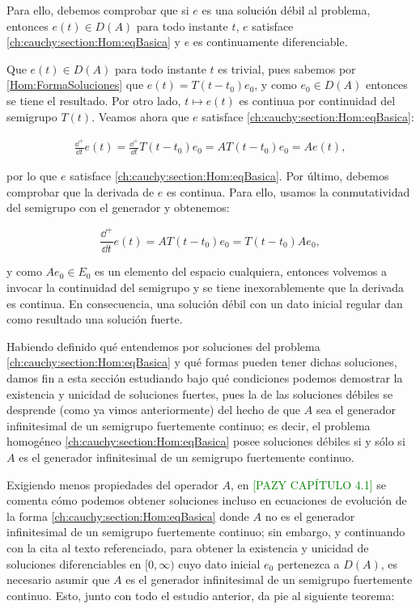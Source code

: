 Para ello, debemos comprobar que si $e$ es una solución débil al problema, entonces $e(t) \in D(A)$ para todo instante $t$, $e$ satisface \eqref{ch:cauchy:section:Hom:eqBasica} y $e$ es continuamente diferenciable.

Que $e(t) \in D(A)$ para todo instante $t$ es trivial, pues sabemos por \eqref{Hom:FormaSoluciones} que $e(t) = T(t-t_0)e_0$, y como $e_0 \in D(A)$ entonces se tiene el resultado. Por otro lado, $t \mapsto e(t)$ es continua por continuidad del semigrupo $T(t)$. Veamos ahora que $e$ satisface \eqref{ch:cauchy:section:Hom:eqBasica}:

\begin{align*}
    \frac{\dd^+}{\dd t}e(t) = \frac{\dd^+}{\dd t}T(t-t_0)e_0 = AT(t-t_0)e_0 = Ae(t),
\end{align*}

por lo que $e$ satisface \eqref{ch:cauchy:section:Hom:eqBasica}. Por último, debemos comprobar que la derivada de $e$ es continua. Para ello, usamos la conmutatividad del semigrupo con el generador y obtenemos:

\[\frac{\dd^+}{\dd t}e(t) = AT(t-t_0)e_0 = T(t-t_0)Ae_0,\]

y como $Ae_0 \in E_0$ es un elemento del espacio cualquiera, entonces volvemos a invocar la continuidad del semigrupo y se tiene inexorablemente que la derivada es continua. En consecuencia, una solución débil con un dato inicial regular dan como resultado una solución fuerte.

Habiendo definido qué entendemos por soluciones del problema \eqref{ch:cauchy:section:Hom:eqBasica} y qué formas pueden tener dichas soluciones, damos fin a esta sección estudiando bajo qué condiciones podemos demostrar la existencia y unicidad de soluciones fuertes, pues la de las soluciones débiles se desprende (como ya vimos anteriormente) del hecho de que $A$ sea el generador infinitesimal de un semigrupo fuertemente continuo; es decir, el problema homogéneo \eqref{ch:cauchy:section:Hom:eqBasica} posee soluciones débiles si y sólo si $A$ es el generador infinitesimal de un semigrupo fuertemente continuo.

Exigiendo menos propiedades del operador $A$, en \textcolor{green}{[PAZY CAPÍTULO 4.1]} se comenta cómo podemos obtener soluciones incluso en ecuaciones de evolución de la forma \eqref{ch:cauchy:section:Hom:eqBasica} donde $A$ no es el generador infinitesimal de un semigrupo fuertemente continuo; sin embargo, y continuando con la cita al texto referenciado, para obtener la existencia y unicidad de soluciones diferenciables en $[0, \infty)$ cuyo dato inicial $e_0$ pertenezca a $D(A)$, es necesario asumir que $A$ es el generador infinitesimal de un semigrupo fuertemente continuo. Esto, junto con todo el estudio anterior, da pie al siguiente teorema:\\

